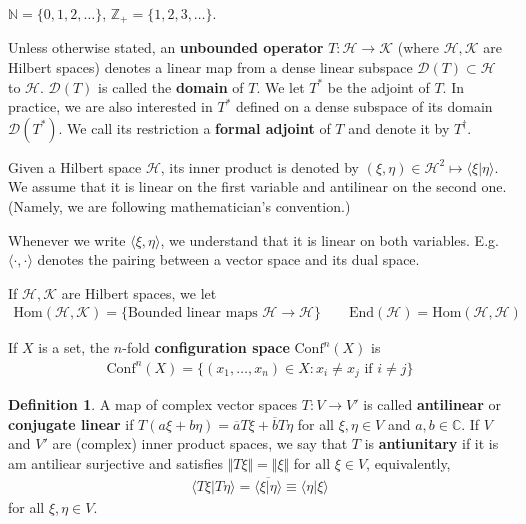\documentclass[12pt,b5paper,notitlepage]{article}
\theoremstyle{definition}
\newtheorem{df}{Definition}[section]
\theoremstyle{plain}
\newcommand{\mc}{\mathcal}
\newcommand{\ovl}{\overline}
\newcommand{\End}{\mathrm{End}} %
\newcommand{\Hom}{\mathrm{Hom}}
\newcommand{\Conf}{\mathrm{Conf}}
\newcommand{\Dom}{\scr{D}}
\newcommand{\bk}[1]{\langle {#1}\rangle}
\newcommand{\scr}{\mathscr}
\newcommand{\Cbb}{\mathbb C}
\newcommand{\Nbb}{\mathbb N}
\newcommand{\Zbb}{\mathbb Z}
\numberwithin{equation}{section}
\begin{document}
$\Nbb=\{0,1,2,\dots\}$, $\Zbb_+=\{1,2,3,\dots\}$.

Unless otherwise stated, an \textbf{unbounded operator} $T:\mc H\rightarrow\mc K$ (where $\mc H,\mc K$ are Hilbert spaces) denotes a linear map from a dense linear subspace $\Dom(T)\subset \mc H$ to $\mc H$. $\Dom(T)$ is called the \textbf{domain} of $T$. We let $T^*$ be the adjoint of $T$. In practice, we are also interested in $T^*$ defined on a dense subspace of its domain $\Dom(T^*)$. We call its restriction a \textbf{formal adjoint} of $T$ and denote it by $T^\dagger$.


Given a Hilbert space $\mc H$, its inner product is denoted by $(\xi,\eta)\in\mc H^2\mapsto\bk{\xi|\eta}$. We assume that it is linear on the first variable and antilinear on the second one. (Namely, we are following mathematician's convention.) 


Whenever we write $\bk{\xi,\eta}$, we understand that it is linear on both variables. E.g. $\bk{\cdot,\cdot}$ denotes the pairing between a vector space and its dual space.


If $\mc H,\mc K$ are Hilbert spaces, we let
\begin{align}
\Hom (\mc H,\mc K)=\{\text{Bounded linear maps }\mc H\rightarrow\mc H\}\qquad\End(\mc H)=\Hom(\mc H,\mc H)
\end{align}

If $X$ is a set, the $n$-fold \textbf{configuration space}  $\Conf^n(X)$ \index{Conf@$\Conf^n(X)$} is
\begin{align}
\Conf^n(X)=\{(x_1,\dots,x_n)\in X:x_i\neq x_j\text{ if }i\neq j\}
\end{align}

\begin{df}
A map of complex vector spaces $T:V\rightarrow V'$ is called \textbf{antilinear}  or \textbf{conjugate linear} if $T(a\xi+b\eta)=\ovl aT\xi+\ovl bT\eta$ for all $\xi,\eta\in V$ and $a,b\in\Cbb$. If $V$ and $V'$ are (complex) inner product spaces, we say that $T$ is \textbf{antiunitary}  if it is am antiliear surjective and satisfies $\Vert T\xi\Vert=\Vert\xi\Vert$ for all $\xi\in V$, equivalently,
\begin{align}\label{eq14}
\bk{T\xi|T\eta}=\ovl{\bk{\xi|\eta}}\equiv\bk{\eta|\xi}
\end{align}
for all $\xi,\eta\in V$.
\end{df}


\newpage
\end{document}
